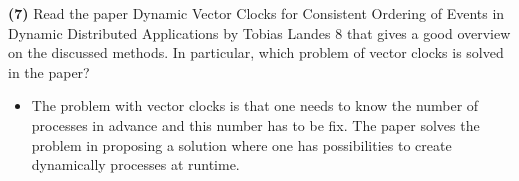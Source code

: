 \documentclass[11pt]{article}
\renewcommand\part[1]{\vspace{.10in}\textbf{(#1)}}
\begin{document}
\part{7}
Read the paper Dynamic Vector Clocks for Consistent Ordering of Events in Dynamic Distributed
Applications by Tobias Landes 8
that gives a good overview on the discussed methods. In particular,
which problem of vector clocks is solved in the paper?


\begin{itemize}
	\item The problem with vector clocks is that one needs to know the number of processes in advance and this number has to be fix. The paper solves the problem in proposing a solution where one has possibilities to create dynamically processes at runtime.
\end{itemize}
\end{document}

